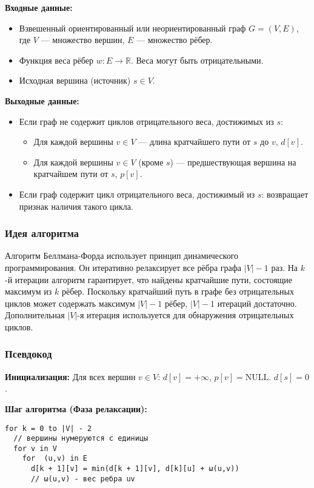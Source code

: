 \noindent \textbf{Входные данные:}
\begin{itemize}
	\item Взвешенный ориентированный или неориентированный граф $G=(V, E)$, где $V$ --- множество вершин, $E$ --- множество рёбер.
	\item Функция веса рёбер $w: E \to \mathbb{R}$. Веса могут быть отрицательными.
	\item Исходная вершина (источник) $s \in V$.
\end{itemize}

\noindent \textbf{Выходные данные:}
\begin{itemize}
	\item Если граф не содержит циклов отрицательного веса, достижимых из $s$:
	\begin{itemize}
		\item Для каждой вершины $v \in V$ --- длина кратчайшего пути от $s$ до $v$, $d[v]$.
		\item Для каждой вершины $v \in V$ (кроме $s$) --- предшествующая вершина на кратчайшем пути от $s$, $p[v]$.
	\end{itemize}
	\item Если граф содержит цикл отрицательного веса, достижимый из $s$: возвращает признак наличия такого цикла.
\end{itemize}

\subsubsection{Идея алгоритма}
Алгоритм Беллмана-Форда использует принцип динамического программирования. Он итеративно релаксирует все рёбра графа $|V|-1$ раз. На $k$-й итерации алгоритм гарантирует, что найдены кратчайшие пути, состоящие максимум из $k$ рёбер. Поскольку кратчайший путь в графе без отрицательных циклов может содержать максимум $|V|-1$ рёбер, $|V|-1$ итераций достаточно. Дополнительная $|V|$-я итерация используется для обнаружения отрицательных циклов.

\subsubsection{Псевдокод}
\noindent \textbf{Инициализация:}
Для всех вершин $v \in V$:
$d[v] = +\infty$, $p[v] = \text{NULL}$.
$d[s] = 0$.

\noindent \textbf{Шаг алгоритма (Фаза релаксации):}
\begin{verbatim}
for k = 0 to |V| - 2
  // вершины нумеруются с единицы
  for v in V
    for  (u,v) in E
      d[k + 1][v] = min(d[k + 1][v], d[k][u] + ω(u,v))  
      // ω(u,v) - вес ребра uv
\end{verbatim}

